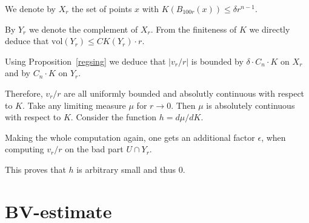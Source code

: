 \documentclass[12pt,leqno]{amsart}
\numberwithin{equation}{section}
\newtheorem{prop}[thm]{PROPOSITION}
\theoremstyle{definition}
\newtheorem{defn}[thm]{Definition}%
\theoremstyle{remark}
\newcommand{\pref}[1]{Proposition~\ref{#1}}
\newcommand{\vol}{\mathrm{vol}}
\newcommand{\R}{\mathbb{R}}
\def\:{\colon}
\begin{document}
 We denote by $X_r$ the set of points $x$ with
$K(B_{100 r} (x)) \leq \delta r^{n-1}$.

 By $Y_r$ we denote the complement of $X_r$. From the finiteness of $K$ we directly deduce that $\vol (Y_r) \leq C K (Y_r) \cdot r $.

 Using \pref{regsing} we deduce that $|v_r /r|$ is bounded by $\delta \cdot C_n \cdot  K$
on $X_r$ and by  $C_n  \cdot K$ on $Y_r$.

 Therefore, $v_r /r$ are all uniformly bounded and absolutly continuous with respect to $K$.  Take any limiting measure $\mu$ for $r\to 0$.
Then $\mu$ is absolutely continuous with respect to  $K$. Consider the function
$h= d \mu /dK$.


 Making the whole computation again, one gets an additional factor $\epsilon$, when computing $v_r /r$
on the bad part $U \cap Y_r$.

This proves that $h$ is arbitrary small and thus $0$.










\section{BV-estimate}\label{sec-BV-estimate}
\end{document}
